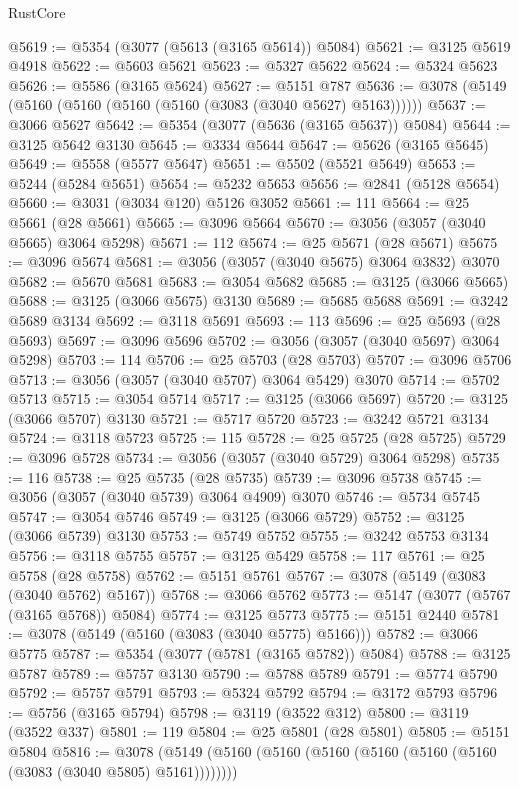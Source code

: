 \begin{lexlean}{RustCore}
\begin{coremodule}
@5619 := @5354 (@3077 (@5613 (@3165 @5614)) @5084)
@5621 := @3125 @5619 @4918
@5622 := @5603 @5621
@5623 := @5327 @5622
@5624 := @5324 @5623
@5626 := @5586 (@3165 @5624)
@5627 := @5151 @787
@5636 := @3078 (@5149 (@5160 (@5160 (@5160 (@5160 (@3083 (@3040 @5627) @5163))))))
@5637 := @3066 @5627
@5642 := @5354 (@3077 (@5636 (@3165 @5637)) @5084)
@5644 := @3125 @5642 @3130
@5645 := @3334 @5644
@5647 := @5626 (@3165 @5645)
@5649 := @5558 (@5577 @5647)
@5651 := @5502 (@5521 @5649)
@5653 := @5244 (@5284 @5651)
@5654 := @5232 @5653
@5656 := @2841 (@5128 @5654)
@5660 := @3031 (@3034 @120) @5126 @3052
@5661 := 111
@5664 := @25 @5661 (@28 @5661)
@5665 := @3096 @5664
@5670 := @3056 (@3057 (@3040 @5665) @3064 @5298)
@5671 := 112
@5674 := @25 @5671 (@28 @5671)
@5675 := @3096 @5674
@5681 := @3056 (@3057 (@3040 @5675) @3064 @3832) @3070
@5682 := @5670 @5681
@5683 := @3054 @5682
@5685 := @3125 (@3066 @5665)
@5688 := @3125 (@3066 @5675) @3130
@5689 := @5685 @5688
@5691 := @3242 @5689 @3134
@5692 := @3118 @5691
@5693 := 113
@5696 := @25 @5693 (@28 @5693)
@5697 := @3096 @5696
@5702 := @3056 (@3057 (@3040 @5697) @3064 @5298)
@5703 := 114
@5706 := @25 @5703 (@28 @5703)
@5707 := @3096 @5706
@5713 := @3056 (@3057 (@3040 @5707) @3064 @5429) @3070
@5714 := @5702 @5713
@5715 := @3054 @5714
@5717 := @3125 (@3066 @5697)
@5720 := @3125 (@3066 @5707) @3130
@5721 := @5717 @5720
@5723 := @3242 @5721 @3134
@5724 := @3118 @5723
@5725 := 115
@5728 := @25 @5725 (@28 @5725)
@5729 := @3096 @5728
@5734 := @3056 (@3057 (@3040 @5729) @3064 @5298)
@5735 := 116
@5738 := @25 @5735 (@28 @5735)
@5739 := @3096 @5738
@5745 := @3056 (@3057 (@3040 @5739) @3064 @4909) @3070
@5746 := @5734 @5745
@5747 := @3054 @5746
@5749 := @3125 (@3066 @5729)
@5752 := @3125 (@3066 @5739) @3130
@5753 := @5749 @5752
@5755 := @3242 @5753 @3134
@5756 := @3118 @5755
@5757 := @3125 @5429
@5758 := 117
@5761 := @25 @5758 (@28 @5758)
@5762 := @5151 @5761
@5767 := @3078 (@5149 (@3083 (@3040 @5762) @5167))
@5768 := @3066 @5762
@5773 := @5147 (@3077 (@5767 (@3165 @5768)) @5084)
@5774 := @3125 @5773
@5775 := @5151 @2440
@5781 := @3078 (@5149 (@5160 (@3083 (@3040 @5775) @5166)))
@5782 := @3066 @5775
@5787 := @5354 (@3077 (@5781 (@3165 @5782)) @5084)
@5788 := @3125 @5787
@5789 := @5757 @3130
@5790 := @5788 @5789
@5791 := @5774 @5790
@5792 := @5757 @5791
@5793 := @5324 @5792
@5794 := @3172 @5793
@5796 := @5756 (@3165 @5794)
@5798 := @3119 (@3522 @312)
@5800 := @3119 (@3522 @337)
@5801 := 119
@5804 := @25 @5801 (@28 @5801)
@5805 := @5151 @5804
@5816 := @3078 (@5149 (@5160 (@5160 (@5160 (@5160 (@5160 (@5160 (@3083 (@3040 @5805) @5161))))))))

\end{coremodule}
\end{lexlean}
